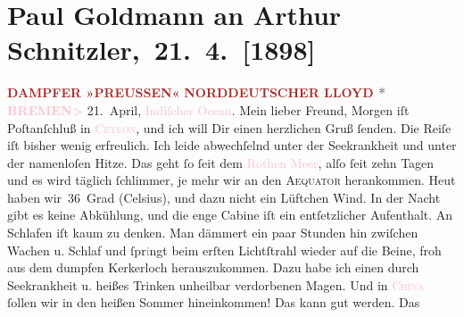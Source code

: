 

               \section[ Paul Goldmann an Arthur Schnitzler, 21. 4. {[}1898{]}]{Paul Goldmann an Arthur Schnitzler, 21. 4. {[}1898{]}}\nopagebreak{}\rehead{ }\normalsize\beginnumbering{} \toendnotes[C]{\smallbreak\pagebreak[2]} 
\toendnotes[C]{\smallbreak}\pstart
           \noindent{}\centering{}{\pb}\textcolor{gray}{\textbf{\textcolor{brown}{DAMPFER »PREUSSEN«}{}\ledrightnote{\textcolor{brown}{Preussen}}}}\pend
           \pstart
           \noindent{}\textcolor{gray}{\textbf{\textcolor{brown}{NORDDEUTSCHER LLOYD}{}\ledrightnote{\textcolor{brown}{Norddeutscher Lloyd}} * \textcolor{pink}{BREMEN>}{}\ledrightnote{\textcolor{pink}{Bremen}}}}\pend
           \pstart
           \raggedleft{}21. April, \textcolor{pink}{Indiſcher Ocean}{}\ledrightnote{\textcolor{pink}{Indischer Ozean}}.\pend
           \pstart\center{}Mein lieber Freund,\pend\pstart
           Morgen iſt Poſtanſchluß in \textsc{\textcolor{pink}{Ceylon}{}\ledrightnote{\textcolor{pink}{Sri Lanka}}}, und ich will Dir einen herzlichen Gruß ſenden.\pend
           \pstart
           Die Reiſe iſt bisher wenig erfreulich. Ich leide abwechſelnd unter der Seekrankheit
               und unter der namenloſen Hitze. Das geht ſo ſeit dem \textcolor{pink}{Rothen Meer}{}\ledrightnote{\textcolor{pink}{Rotes Meer}}, alſo ſeit zehn Tagen {\pb}und es wird täglich ſchlimmer, je mehr wir an den
                  \textsc{Aequator} herankommen. Heut haben wir 36 Grad (Celsius), und dazu nicht ein Lüftchen Wind. In der
               Nacht gibt es keine Abkühlung, und die enge Cabine iſt ein entſetzlicher Aufenthalt.
               An Schlafen iſt kaum zu denken. Man dämmert ein paar Stunden hin zwiſchen Wachen
                  u. Schlaf und ſpr\textcolor{gray}{i}ngt beim erſten
               Lichtſtrahl wieder auf die Beine, froh aus {\pb}dem
               dumpfen Kerkerloch herauszukommen. Dazu habe ich einen \strikeout{\textcolor{gray}{du}} durch Seekrankheit u. heißes Trinken unheilbar verdorbenen Magen. Und in \textsc{\textcolor{pink}{China}{}\ledrightnote{\textcolor{pink}{China}}} ſollen wir in den heißen Sommer hineinkommen! Das kann gut werden. Das
